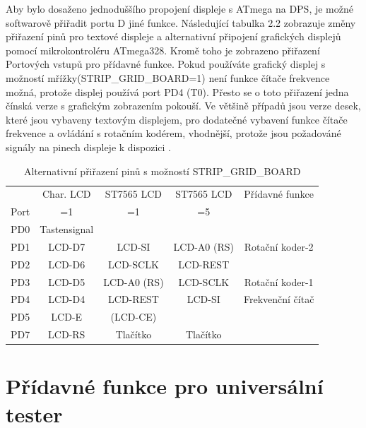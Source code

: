 Aby bylo dosaženo jednoduššího propojení displeje s ATmega na DPS, je možné softwarově přiřadit portu D jiné funkce. Následující tabulka 2.2 zobrazuje změny přiřazení pinů pro textové displeje a alternativní připojení grafických displejů pomocí mikrokontroléru ATmega328. Kromě toho je zobrazeno přiřazení Portových vstupů pro přídavné funkce.
Pokud používáte grafický displej s možností mřížky(STRIP\_GRID\_BOARD=1)
není funkce čítače frekvence možná, protože displej používá port PD4 (T0).
Přesto se o toto přiřazení jedna čínská verze s grafickým zobrazením pokouší.
Ve většině případů jsou verze desek, které jsou vybaveny textovým displejem, pro dodatečné vybavení
funkce čítače frekvence a ovládání s rotačním kodérem, vhodnější, protože jsou požadováné
signály na pinech displeje k dispozici . 


\begin{table}[H]
  \begin{center}
    \begin{tabular}{| c || c | c | c | c |}
    \hline
           & Char. LCD      & ST7565 LCD     & ST7565 LCD   & Přídavné funkce \\
      Port &    =1          &    =1          &    =5        &  \\
    \hline
    \hline
    PD0    &  Tastensignal  &                &              &  \\
    \hline
    PD1    &  LCD-D7        & LCD-SI         &  LCD-A0 (RS) &  Rotační koder-2 \\
    \hline
    PD2    &  LCD-D6        & LCD-SCLK       &  LCD-REST    &  \\
    \hline
    PD3    &  LCD-D5        & LCD-A0 (RS)    &  LCD-SCLK    &  Rotační koder-1 \\
    \hline
    PD4    &  LCD-D4        & LCD-REST       &  LCD-SI      &  Frekvenční čítač \\
    \hline
    PD5    &  LCD-E         & (LCD-CE)       &              &  \\
    \hline
    PD7    & LCD-RS         & Tlačítko   & Tlačítko &  \\
    \hline
    \end{tabular}
  \end{center}
  \caption{Alternativní přiřazení pinů s možností STRIP\_GRID\_BOARD}
  \label{tab:grid-change}
\end{table}

\section{Přídavné funkce pro universální tester}
